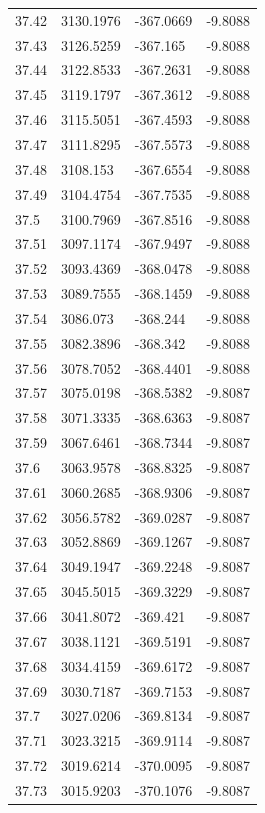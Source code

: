 \begin{table}[H]
\begin{tabular}{llll}
37.42 & 3130.1976 & -367.0669 & -9.8088 \\
37.43 & 3126.5259 & -367.165 & -9.8088 \\
37.44 & 3122.8533 & -367.2631 & -9.8088 \\
37.45 & 3119.1797 & -367.3612 & -9.8088 \\
37.46 & 3115.5051 & -367.4593 & -9.8088 \\
37.47 & 3111.8295 & -367.5573 & -9.8088 \\
37.48 & 3108.153 & -367.6554 & -9.8088 \\
37.49 & 3104.4754 & -367.7535 & -9.8088 \\
37.5 & 3100.7969 & -367.8516 & -9.8088 \\
37.51 & 3097.1174 & -367.9497 & -9.8088 \\
37.52 & 3093.4369 & -368.0478 & -9.8088 \\
37.53 & 3089.7555 & -368.1459 & -9.8088 \\
37.54 & 3086.073 & -368.244 & -9.8088 \\
37.55 & 3082.3896 & -368.342 & -9.8088 \\
37.56 & 3078.7052 & -368.4401 & -9.8088 \\
37.57 & 3075.0198 & -368.5382 & -9.8087 \\
37.58 & 3071.3335 & -368.6363 & -9.8087 \\
37.59 & 3067.6461 & -368.7344 & -9.8087 \\
37.6 & 3063.9578 & -368.8325 & -9.8087 \\
37.61 & 3060.2685 & -368.9306 & -9.8087 \\
37.62 & 3056.5782 & -369.0287 & -9.8087 \\
37.63 & 3052.8869 & -369.1267 & -9.8087 \\
37.64 & 3049.1947 & -369.2248 & -9.8087 \\
37.65 & 3045.5015 & -369.3229 & -9.8087 \\
37.66 & 3041.8072 & -369.421 & -9.8087 \\
37.67 & 3038.1121 & -369.5191 & -9.8087 \\
37.68 & 3034.4159 & -369.6172 & -9.8087 \\
37.69 & 3030.7187 & -369.7153 & -9.8087 \\
37.7 & 3027.0206 & -369.8134 & -9.8087 \\
37.71 & 3023.3215 & -369.9114 & -9.8087 \\
37.72 & 3019.6214 & -370.0095 & -9.8087 \\
37.73 & 3015.9203 & -370.1076 & -9.8087 \\

\end{tabular}
\end{table}
